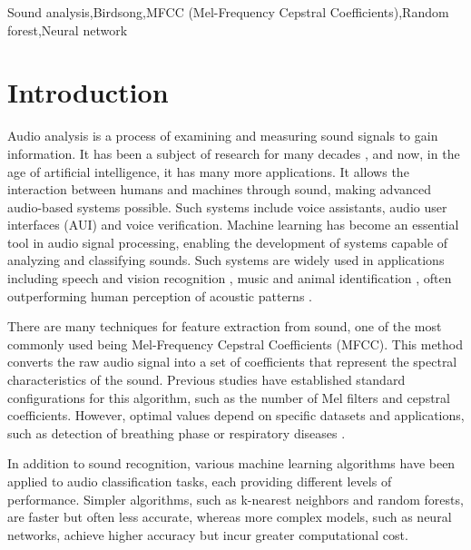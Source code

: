 \documentclass[
onecolumn,
]{ceurart}
\begin{document}
	\begin{keywords}
		Sound analysis\sep Birdsong\sep MFCC (Mel-Frequency Cepstral Coefficients)\sep Random forest\sep Neural network 
	\end{keywords}
	
	\maketitle
	
	\section{Introduction}
	Audio analysis is a process of examining and measuring sound signals to gain information. It has been a subject of research for many decades \cite{hollabaugh1963methods}, and now, in the age of artificial intelligence, it has many more applications. It allows the interaction between humans and machines through sound, making advanced audio-based systems possible. Such systems include voice assistants, audio user interfaces (AUI) and voice verification. Machine learning has become an essential tool in audio signal processing, enabling the development of systems capable of analyzing and classifying sounds. Such systems are widely used in applications including speech and vision recognition \cite{zhu2025systematic}, music \cite{serrano2022new,wozniak2017voice} and animal identification \cite{wood2023pairing,zerdzinski2024fantastic}, often outperforming human perception of acoustic patterns \cite{spille2018comparing}.
	
	
	There are many techniques for feature extraction from sound, one of the most commonly used being Mel-Frequency Cepstral Coefficients (MFCC). This method converts the raw audio signal into a set of coefficients that represent the spectral characteristics of the sound\cite{abdul2022mel}. Previous studies have established standard configurations for this algorithm, such as the number of Mel filters and cepstral coefficients. However, optimal values depend on specific datasets and applications, such as detection of breathing phase \cite{zhantleuova2025optimizing} or respiratory diseases \cite{yan2025optimizing}.
	
	
	In addition to sound recognition, various machine learning algorithms have been applied to audio classification tasks, each providing different levels of performance. Simpler algorithms, such as k-nearest neighbors and random forests, are faster but often less accurate, whereas more complex models, such as neural networks, achieve higher accuracy but incur greater computational cost.
	
\end{document}
